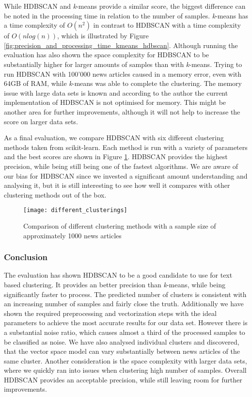 While HDBSCAN and \textit{k}-means provide a similar score,
the biggest difference can be noted in the processing time in relation to the number of samples.
\textit{k}-means has a time complexity of $O(n^2)$ in contrast to HDBSCAN with a time complexity of $O(nlog(n))$,
which is illustrated by Figure \ref{fig:precision_and_processing_time_kmeans_hdbscan}.
Although running the evaluation has also shown the space complexity for HDBSCAN
to be substantially higher for larger amounts of samples than with \textit{k}-means.
Trying to run HDBSCAN with 100'000 news articles caused in a memory error,
even with 64GB of RAM, while \textit{k}-means was able to complete the clustering.
The memory issue with large data sets is known and according to the author the current implementation of HDBSCAN
is not optimised for memory\cite{hdbscan_memory_issue}.
This might be another area for further improvements, although it will not help to increase the score on larger data sets.

As a final evaluation, we compare HDBSCAN with six different clustering methods taken from scikit-learn.
Each method is run with a variety of parameters and the best scores are shown in Figure \ref{fig:different_clusterings}.
HDBSCAN provides the highest precision, while being still being one of the fastest algorithms.
We are aware of our bias for HDBSCAN since we invested a significant amount understanding and analysing it,
but it is still interesting to see how well it compares with other clustering methods out of the box.

\begin{figure}[h]
    \centering
    \texttt{[image: different\_clusterings]}
    \caption{Comparison of different clustering methods with a sample size of approximately 1000 news articles}
    \label{fig:different_clusterings}
\end{figure}

\subsubsection{Conclusion}

The evaluation has shown HDBSCAN to be a good candidate to use for text based clustering.
It provides an better precision than \textit{k}-means, while being significantly faster to process.
The predicted number of clusters is consistent with an increasing number of samples and fairly close the truth.
Additionally we have shown the required preprocessing and vectorization steps with the ideal parameters to achieve the most accurate results for our data set.
However there is a substantial noise ratio, which causes almost a third of the processed samples to be classified as noise.
We have also analysed individual clusters and discovered,
that the vector space model can vary substantially between news articles of the same cluster.
Another consideration is the space complexity with larger data sets,
where we quickly ran into issues when clustering high number of samples.
Overall HDBSCAN provides an acceptable precision, while still leaving room for further improvements.
